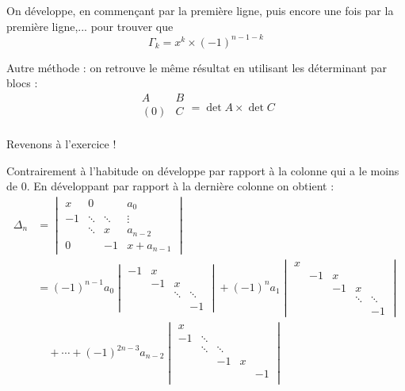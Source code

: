 \documentclass[11pt,a4paper]{article}
\begin{document}
On développe, en commençant par la première ligne, puis encore une fois par la première ligne,...
pour trouver que 
$$\Gamma_k = x^k\times (-1)^{n-1-k}$$

Autre méthode : on retrouve le même résultat en utilisant les déterminant par blocs :
$$\begin{array}{|c|c|} 
A & B \\
\hline
(0) & C \\ 
\end{array}
= \det A \times \det C$$

\bigskip


Revenons à l'exercice !

Contrairement à l'habitude on développe par rapport à la colonne qui a le moins de $0$.
En développant par rapport à la dernière colonne on obtient :
{\footnotesize
\begin{align*}
 \Delta_{n}
& =
   \begin{vmatrix}
   x &  0    &        & a_{0}   \\
    -1 &\ddots &\ddots  &\vdots  \\
      &\ddots &x      & a_{n-2} \\
    0 &       & -1      & x+a_{n-1}
   \end{vmatrix} \\
 & = (-1)^{n-1} a_0 
   \begin{vmatrix}
   -1 &  x    &        &    \\
     & -1 & x  &  \\
      & & \ddots & \ddots       \\
     &       &       & -1
   \end{vmatrix}
+ (-1)^{n} a_1   
\begin{vmatrix}
   x & &&&\\
   & -1 &  x    &        &    \\
   &  & -1 & x  &  \\
    &  & & \ddots & \ddots       \\
    & &       &       & -1
   \end{vmatrix} 
\\
& \quad + \cdots +
(-1)^{2n-3} a_{n-2}   
\begin{vmatrix}
  x &      &    & &      \\
    -1 &\ddots &  & & \\
     &\ddots &\ddots & &  \\
      && -1 & x    &   \\
    &&&& -1 \\

\end{vmatrix}
\end{align*}}
\end{document}
